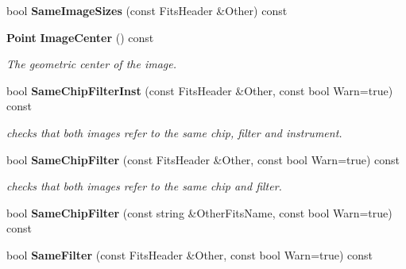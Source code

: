 \begin{CompactItemize}
\item 
{}
bool {\bf Same\-Image\-Sizes} (const Fits\-Header \&Other) const\label{class_fitsheader_a35}

\item 
{}
{\bf Point} {\bf Image\-Center} () const\label{class_fitsheader_a36}

\begin{CompactList}\small\item\em The geometric center of the image.\item\end{CompactList}\item 
{}
bool {\bf Same\-Chip\-Filter\-Inst} (const Fits\-Header \&Other, const bool Warn=true) const\label{class_fitsheader_a37}

\begin{CompactList}\small\item\em checks that both images refer to the same chip, filter and instrument.\item\end{CompactList}\item 
{}
bool {\bf Same\-Chip\-Filter} (const Fits\-Header \&Other, const bool Warn=true) const\label{class_fitsheader_a38}

\begin{CompactList}\small\item\em checks that both images refer to the same chip and filter.\item\end{CompactList}\item 
{}
bool {\bf Same\-Chip\-Filter} (const string \&Other\-Fits\-Name, const bool Warn=true) const\label{class_fitsheader_a39}

\item 
{}
bool {\bf Same\-Filter} (const Fits\-Header \&Other, const bool Warn=true) const\label{class_fitsheader_a40}


\end{CompactItemize}
